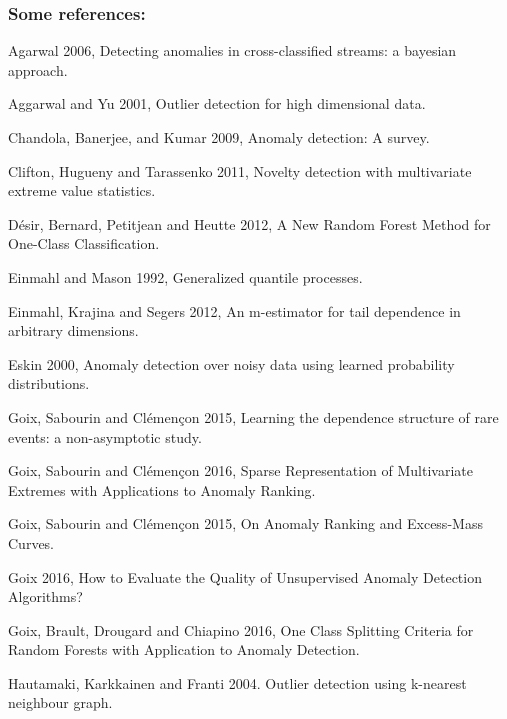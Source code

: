 \documentclass[9pt]{beamer}
\begin{document}
\begin{frame}
\frametitle{Some references:}
\begin{itemize}
\footnotesize{
\item Agarwal 2006, Detecting anomalies in cross-classified streams: a bayesian approach.

\item Aggarwal and Yu 2001, Outlier detection for high dimensional data.


\item Chandola, Banerjee, and Kumar 2009, Anomaly detection: A survey.


\item Clifton, Hugueny and Tarassenko 2011, Novelty detection with multivariate extreme value statistics.

\item Désir, Bernard, Petitjean and Heutte 2012, A New Random Forest Method for One-Class Classification.

\item Einmahl and Mason 1992, Generalized quantile processes.


\item Einmahl, Krajina and Segers 2012, An m-estimator for tail dependence in arbitrary dimensions.

\item Eskin 2000,  Anomaly detection over noisy data using learned probability distributions.

\item Goix, Sabourin and Clémençon 2015, Learning the dependence structure of rare events: a non-asymptotic study.

\item Goix, Sabourin and Clémençon 2016, Sparse Representation of Multivariate Extremes with Applications to Anomaly Ranking.

\item Goix, Sabourin and Clémençon 2015, On Anomaly Ranking and Excess-Mass Curves.

\item Goix 2016, How to Evaluate the Quality of Unsupervised Anomaly Detection Algorithms?

\item Goix, Brault, Drougard and Chiapino 2016, One Class Splitting Criteria for Random Forests with Application to Anomaly Detection.

\item Hautamaki, Karkkainen and Franti 2004. Outlier detection using k-nearest neighbour graph.

}
\end{itemize}
\end{frame}
\end{document}
